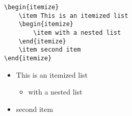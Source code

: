 \documentclass[12pt,a4paper]{article}
\begin{document}
\begin{verbatim}
\begin{itemize}
	\item This is an itemized list
	\begin{itemize}
		\item with a nested list
	\end{itemize}
	\item second item
\end{itemize}
\end{verbatim}
\begin{itemize}
	\item This is an itemized list
	\begin{itemize}
		\item with a nested list
	\end{itemize}
	\item second item
\end{itemize}
\end{document}
